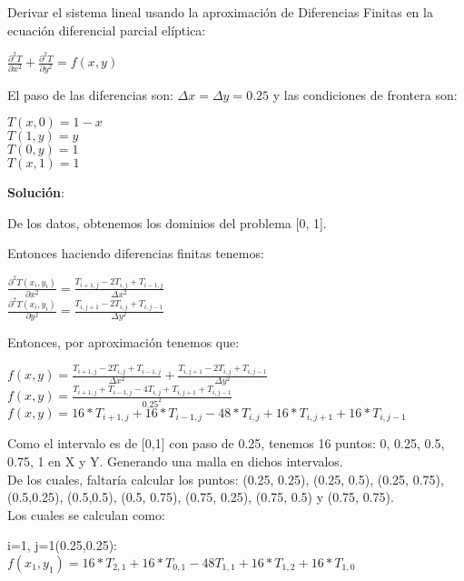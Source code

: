 Derivar el sistema lineal usando la aproximación de Diferencias Finitas en la ecuación diferencial parcial elíptica:
\begin{center}
  $ \frac{\partial^2 T}{\partial x^2} + \frac{\partial^2 T}{\partial y^2} = f(x,y)$    
\end{center}

El paso de las diferencias son: $ \Delta x = \Delta y = 0.25 $ y las condiciones de frontera son:
\begin{center}
  $T(x,0) = 1-x$\\
  $T(1,y)=y$\\
  $T(0,y)=1$\\
  $T(x,1)=1$    
\end{center}

\textbf{Solución}:

De los datos, obtenemos los dominios del problema [0, 1].

Entonces haciendo diferencias finitas tenemos:
\begin{center}
  $ \frac{\partial^2 T(x_i , y_i)}{\partial x^2} = \frac{T_{i+1,j} - 2 T_{i,j} + T_{i-1,j}}{\Delta x ^2}$\\
  $ \frac{\partial^2 T(x_i , y_i)}{\partial y^2} = \frac{T_{i,j+1} - 2 T_{i,j} + T_{i,j-1}}{\Delta y ^2}$\\
\end{center}

Entonces, por aproximación tenemos que:
\begin{center}
  $f(x,y) = \frac{T_{i+1,j} - 2 T_{i,j} + T_{i-1,j}}{\Delta x ^2} + \frac{T_{i,j+1} - 2 T_{i,j} + T_{i,j-1}}{\Delta y ^2}$\\
  $f(x,y) = \frac{T_{i+1,j} + T_{i-1,j} - 4 T_{i,j} + T_{i,j+1} + T_{i,j-1}}{0.25 ^2} $\\
  $f(x,y) = 16*T_{i+1,j} + 16*T_{i-1,j} - 48* T_{i,j} + 16*T_{i,j+1} + 16*T_{i,j-1} $\\
\end{center}

Como el intervalo es de [0,1] con paso de 0.25, tenemos 16 puntos: 0, 0.25, 0.5, 0.75, 1 en X y Y. Generando una malla en dichos intervalos. \\

De los cuales, faltaría calcular los puntos: (0.25, 0.25), (0.25, 0.5), (0.25, 0.75), (0.5,0.25), (0.5,0.5), (0.5, 0.75), (0.75, 0.25), (0.75, 0.5) y (0.75, 0.75).\\

Los cuales se calculan como:

i=1, j=1(0.25,0.25):\\
$f(x_1,y_1) = 16*T_{2,1} + 16*T_{0,1} - 48 T_{1,1} + 16*T_{1,2} + 16*T_{1,0}$\\

